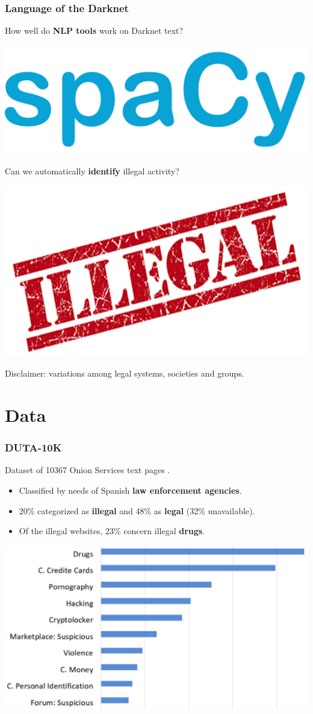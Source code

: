 \documentclass[t,xcolor={svgnames,table},aspectratio=169]{beamer}
\begin{document}
\begin{frame}
	\frametitle{Language of the Darknet}
	\LARGE
	\begin{center}
	How well do \textbf{NLP tools} work on Darknet text?
	
	\includegraphics[width=.3\textwidth]{spacy.png}
	\vfill
	\pause
	
	Can we automatically \textbf{identify} illegal activity?
	
	\includegraphics[width=.3\textwidth]{illegal.jpg}
	\vfill
	\pause
	
	\Large
	Disclaimer:
	variations among legal systems, societies and groups.
	\end{center}
\end{frame}

\section{Data}

\begin{frame}
	\frametitle{DUTA-10K}
	\Large
	Dataset of 10367 Onion Services text pages \cite{AlNabki19}.

	\begin{itemize}\setlength\itemsep{1em}
		\item Classified by needs of Spanish \textbf{law enforcement agencies}.
		\item 20\% categorized as \textbf{illegal} and 48\% as \textbf{legal} (32\% unavailable).
		\item Of the illegal websites, 23\% concern illegal \textbf{drugs}.
	\end{itemize}
	\vspace{5mm}
	\pause
	
	\includegraphics[width=\textwidth]{suspicious.png}
\end{frame}
\end{document}
